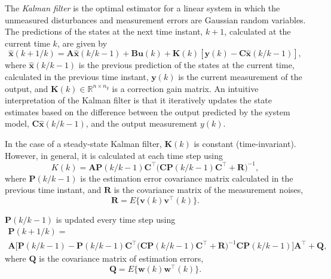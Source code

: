 The \textit{Kalman filter} \citep{kalman_new_1961} is the optimal estimator for a linear system in which the unmeasured disturbances and measurement errors are Gaussian random variables. The predictions of the states at the next time instant, $k+1$, calculated at the current time $k$, are given by
\begin{equation} \label{eq:xkp1_hat}
	\mathbf{\hat{x}}(k+1/k) = \mathbf{A} \mathbf{\hat{x}}(k/k-1) + \mathbf{B}\mathbf{u}(k) + 
	\mathbf{K}(k)\left[\mathbf{y}(k) - \mathbf{C} \mathbf{\hat{x}}(k/k-1)\right],
\end{equation}
where $\mathbf{\hat{x}}(k/k-1)$ is the previous prediction of the states at the current time, calculated in the previous time instant, $\mathbf{y}(k)$ is the current measurement of the output, and $\mathbf{K}(k) \in \mathbb{R}^{n \times n_y}$ is a correction gain matrix. An intuitive interpretation of the Kalman filter is that it iteratively updates the state estimates based on the difference between the output predicted by the system model, $\mathbf{C} \mathbf{\hat{x}}(k/k-1)$, and the output measurement ${y}(k)$.

In the case of a steady-state Kalman filter, $\mathbf{K}(k)$ is constant (time-invariant). However, in general, it is calculated at each time step using
\begin{equation} \label{eq:Kk}
	K(k) = \mathbf{A}\mathbf{P}(k/k-1)\mathbf{C}^\intercal \big(\mathbf{C}\mathbf{P}(k/k-1)\mathbf{C}^\intercal + \mathbf{R}\big)^{-1},
\end{equation}
where $\mathbf{P}(k/k-1)$ is the estimation error covariance matrix calculated in the previous time instant, and $\mathbf{R}$ is the covariance matrix of the measurement noises,
\begin{equation} \label{eq:R}
	\mathbf{R} = E\{ \mathbf{v}(k) \mathbf{v}^\intercal(k) \}.
\end{equation}

$\mathbf{P}(k/k-1)$ is updated every time step using
\begin{multline} \label{eq:Pk}
	\mathbf{P}(k+1/k) = \\ \mathbf{A}\big[\mathbf{P}(k/k-1)
	- \mathbf{P}(k/k-1)\mathbf{C}^\intercal\big(\mathbf{C}\mathbf{P}(k/k-1)\mathbf{C}^\intercal + 
	\mathbf{R}\big)^{-1}\mathbf{C}\mathbf{P}(k/k-1) \big]\mathbf{A}^\intercal + \mathbf{Q},
\end{multline}
where $\mathbf{Q}$ is the covariance matrix of estimation errors,
\begin{equation} \label{eq:Q}
	\mathbf{Q} = E\{ \mathbf{w}(k) \mathbf{w}^\intercal(k) \}.
\end{equation}

